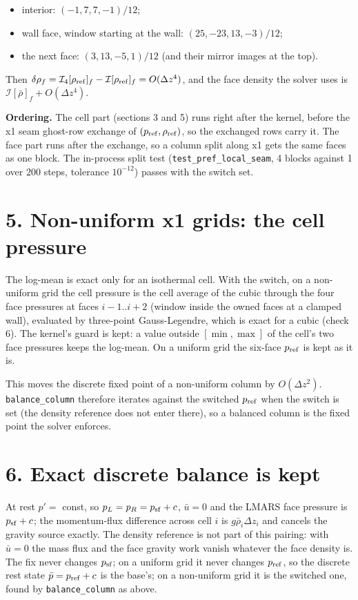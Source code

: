 \documentclass[11pt,a4paper]{article}
\begin{document}
\begin{itemize}
\item interior: $(-1, 7, 7, -1)/12$;
\item wall face, window starting at the wall: $(25, -23, 13, -3)/12$;
\item the next face: $(3, 13, -5, 1)/12$ (and their mirror images at the top).
\end{itemize}

Then $\delta\rho_f = \mathcal I_4[\rho_{\rm ref}]_f - \mathcal I[\rho_{\rm ref}]_f = O(\Delta z^4)$, and the face
density the solver uses is $\mathcal I[\bar\rho]_f + O(\Delta z^4)$.

\textbf{Ordering.} The cell part (sections 3 and 5) runs right after the kernel, before the x1 seam ghost-row
exchange of $(p_{\rm ref}, \rho_{\rm ref})$, so the exchanged rows carry it. The face part runs after the
exchange, so a column split along x1 gets the same faces as one block. The in-process split test
(\texttt{test\_pref\_local\_seam}, 4 blocks against 1 over 200 steps, tolerance $10^{-12}$) passes with the switch set.

\section*{5. Non-uniform x1 grids: the cell pressure}

The log-mean is exact only for an isothermal cell. With the switch, on a non-uniform grid the cell pressure is
the cell average of the cubic through the four face pressures at faces $i-1..i+2$ (window inside the owned
faces at a clamped wall), evaluated by three-point Gauss-Legendre, which is exact for a cubic (check 6). The
kernel's guard is kept: a value outside $[\min, \max]$ of the cell's two face pressures keeps the log-mean.
On a uniform grid the six-face $p_{\rm ref}$ is kept as it is.

This moves the discrete fixed point of a non-uniform column by $O(\Delta z^2)$. \texttt{balance\_column} therefore
iterates against the switched $p_{\rm ref}$ when the switch is set (the density reference does not enter
there), so a balanced column is the fixed point the solver enforces.

\section*{6. Exact discrete balance is kept}

At rest $p' = $ const, so $p_L = p_R = p_{\rm sf} + c$, $\bar u = 0$ and the LMARS face pressure is
$p_{\rm sf} + c$; the momentum-flux difference across cell $i$ is $g\bar\rho_i\Delta z_i$ and cancels the gravity
source exactly. The density reference is not part of this pairing: with $\bar u = 0$ the mass flux and the
face gravity work vanish whatever the face density is. The fix never changes $p_{\rm sf}$; on a uniform grid
it never changes $p_{\rm ref}$, so the discrete rest state $\bar p = p_{\rm ref} + c$ is the base's; on a
non-uniform grid it is the switched one, found by \texttt{balance\_column} as above.
\end{document}
